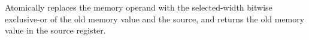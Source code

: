 Atomically replaces the memory operand with the selected-width bitwise exclusive-or of the old memory value and the source, and returns the old memory value in the source register.
